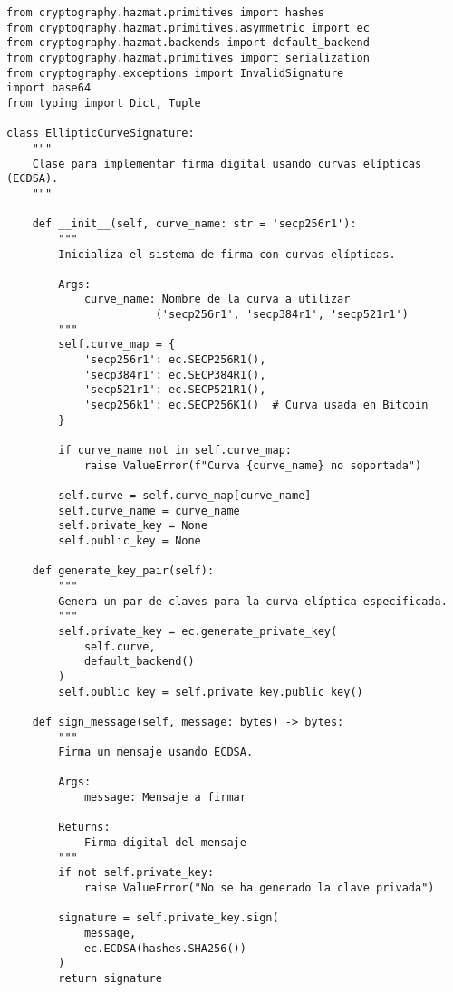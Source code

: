 \documentclass[12pt,a4paper]{article}
\begin{document}
\begin{lstlisting}[caption=Implementación de firma digital con curvas elípticas]
from cryptography.hazmat.primitives import hashes
from cryptography.hazmat.primitives.asymmetric import ec
from cryptography.hazmat.backends import default_backend
from cryptography.hazmat.primitives import serialization
from cryptography.exceptions import InvalidSignature
import base64
from typing import Dict, Tuple

class EllipticCurveSignature:
    """
    Clase para implementar firma digital usando curvas elípticas (ECDSA).
    """
    
    def __init__(self, curve_name: str = 'secp256r1'):
        """
        Inicializa el sistema de firma con curvas elípticas.
        
        Args:
            curve_name: Nombre de la curva a utilizar
                       ('secp256r1', 'secp384r1', 'secp521r1')
        """
        self.curve_map = {
            'secp256r1': ec.SECP256R1(),
            'secp384r1': ec.SECP384R1(),
            'secp521r1': ec.SECP521R1(),
            'secp256k1': ec.SECP256K1()  # Curva usada en Bitcoin
        }
        
        if curve_name not in self.curve_map:
            raise ValueError(f"Curva {curve_name} no soportada")
            
        self.curve = self.curve_map[curve_name]
        self.curve_name = curve_name
        self.private_key = None
        self.public_key = None
        
    def generate_key_pair(self):
        """
        Genera un par de claves para la curva elíptica especificada.
        """
        self.private_key = ec.generate_private_key(
            self.curve,
            default_backend()
        )
        self.public_key = self.private_key.public_key()
        
    def sign_message(self, message: bytes) -> bytes:
        """
        Firma un mensaje usando ECDSA.
        
        Args:
            message: Mensaje a firmar
            
        Returns:
            Firma digital del mensaje
        """
        if not self.private_key:
            raise ValueError("No se ha generado la clave privada")
            
        signature = self.private_key.sign(
            message,
            ec.ECDSA(hashes.SHA256())
        )
        return signature
    

\end{lstlisting}
\end{document}
